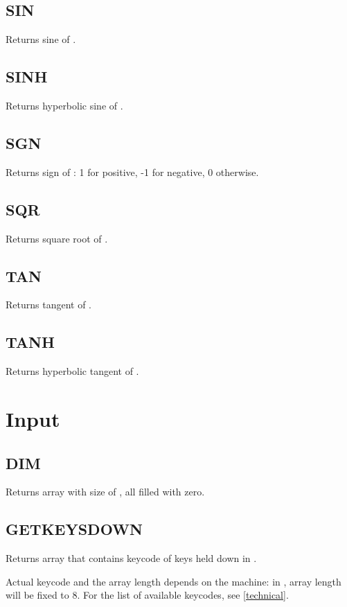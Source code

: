     \subsection{SIN}
        \par
        Returns sine of .
    \subsection{SINH}
        \par
        Returns hyperbolic sine of .
    \subsection{SGN}
        \par
        Returns sign of : 1 for positive, -1 for negative, 0 otherwise.
    \subsection{SQR}
        \par
        Returns square root of .
    \subsection{TAN}
        \par
        Returns tangent of .
    \subsection{TANH}
        \par
        Returns hyperbolic tangent of .

\section{Input}

    \subsection{DIM}
        \par
        Returns array with size of , all filled with zero.
    \subsection{GETKEYSDOWN}
        \par
        Returns array that contains keycode of keys held down in .\par
        Actual keycode and the array length depends on the machine: in \thismachine , array length will be fixed to 8. For the list of available keycodes, see \ref{technical}.
